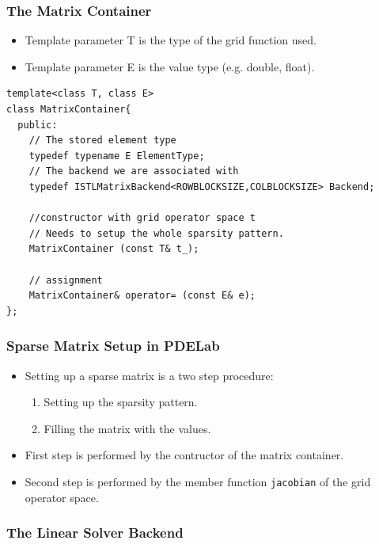 {\begin{frame}[fragile]
  \frametitle{The Matrix Container}
\begin{itemize}
  \item Template parameter T is the type of the grid function used.
  \item Template parameter E is the value type (e.g. double, float).
  \end{itemize}
  \begin{lstlisting}[basicstyle=\scriptsize]
template<class T, class E>
class MatrixContainer{
  public:
    // The stored element type
    typedef typename E ElementType;
    // The backend we are associated with
    typedef ISTLMatrixBackend<ROWBLOCKSIZE,COLBLOCKSIZE> Backend;
      
    //constructor with grid operator space t
    // Needs to setup the whole sparsity pattern.
    MatrixContainer (const T& t_);
      
    // assignment
    MatrixContainer& operator= (const E& e);
};
  \end{lstlisting}
\end{frame}
\begin{frame}[fragile]
  \frametitle{Sparse Matrix Setup in PDELab}
  \begin{itemize}
  \item Setting up a sparse matrix is a two step procedure:
    \begin{enumerate}
    \item Setting up the sparsity pattern.
    \item Filling the matrix with the values.
    \end{enumerate}
  \item First step is performed by the contructor of the matrix
    container.
  \item Second step is performed by the member function
    \lstinline!jacobian! of the grid operator space.
  \end{itemize}

\end{frame}

\subsubsection{The Linear Solver Backend}
\label{sec:line-solv-back}

}
